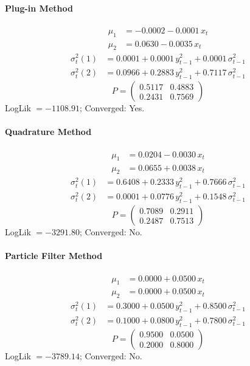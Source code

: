 \documentclass[11pt, a4paper]{article}
\begin{document}
\paragraph{Plug-in Method}
\begin{align}
\mu_{1} &= -0.0002 -0.0001\, x_t \\
\mu_{2} &= 0.0630 -0.0035\, x_t
\end{align}
\begin{align}
\sigma^2_{t}(1) &= 0.0001 + 0.0001\, y_{t-1}^2 + 0.0001\, \sigma^2_{t-1} \\
\sigma^2_{t}(2) &= 0.0966 + 0.2883\, y_{t-1}^2 + 0.7117\, \sigma^2_{t-1}
\end{align}
\begin{equation}
P = \begin{pmatrix} 0.5117 & 0.4883 \\ 0.2431 & 0.7569 \end{pmatrix}
\end{equation}
LogLik $= -1108.91$; Converged: Yes.

\paragraph{Quadrature Method}
\begin{align}
\mu_{1} &= 0.0204 -0.0030\, x_t \\
\mu_{2} &= 0.0655 + 0.0038\, x_t
\end{align}
\begin{align}
\sigma^2_{t}(1) &= 0.6408 + 0.2333\, y_{t-1}^2 + 0.7666\, \sigma^2_{t-1} \\
\sigma^2_{t}(2) &= 0.0001 + 0.0776\, y_{t-1}^2 + 0.1548\, \sigma^2_{t-1}
\end{align}
\begin{equation}
P = \begin{pmatrix} 0.7089 & 0.2911 \\ 0.2487 & 0.7513 \end{pmatrix}
\end{equation}
LogLik $= -3291.80$; Converged: No.

\paragraph{Particle Filter Method}
\begin{align}
\mu_{1} &= 0.0000 + 0.0500\, x_t \\
\mu_{2} &= 0.0000 + 0.0500\, x_t
\end{align}
\begin{align}
\sigma^2_{t}(1) &= 0.3000 + 0.0500\, y_{t-1}^2 + 0.8500\, \sigma^2_{t-1} \\
\sigma^2_{t}(2) &= 0.1000 + 0.0800\, y_{t-1}^2 + 0.7800\, \sigma^2_{t-1}
\end{align}
\begin{equation}
P = \begin{pmatrix} 0.9500 & 0.0500 \\ 0.2000 & 0.8000 \end{pmatrix}
\end{equation}
LogLik $= -3789.14$; Converged: No.
\end{document}
